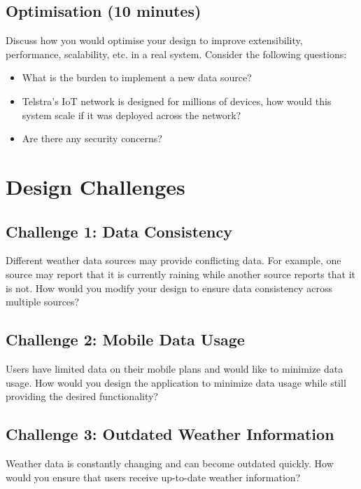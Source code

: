 \documentclass{csse4400}
\begin{document}
\subsection*{Optimisation (10 minutes)}
Discuss how you would optimise your design to improve extensibility, performance, scalability, etc. in a real system.
Consider the following questions:
\begin{itemize}
\item What is the burden to implement a new data source?
\item Telstra's IoT network is designed for millions of devices, how would this system scale if it was deployed across the network?
\item Are there any security concerns?
\end{itemize}

\section{Design Challenges}

\subsection*{Challenge 1: Data Consistency}
Different weather data sources may provide conflicting data.
For example, one source may report that it is currently raining while another source reports that it is not.
How would you modify your design to ensure data consistency across multiple sources?

\subsection*{Challenge 2: Mobile Data Usage}
Users have limited data on their mobile plans and would like to minimize data usage.
How would you design the application to minimize data usage while still providing the desired functionality?

\subsection*{Challenge 3: Outdated Weather Information}
Weather data is constantly changing and can become outdated quickly.
How would you ensure that users receive up-to-date weather information?
\end{document}
